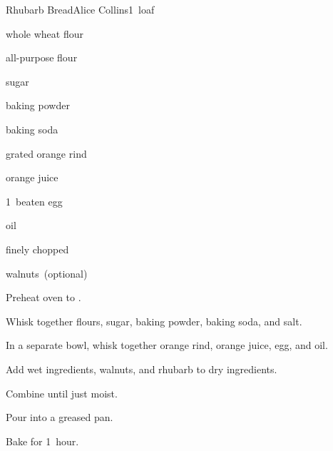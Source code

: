 \begin{recipe}{Rhubarb Bread\UNTESTED}{Alice Collins}{1~loaf}

\begin{ingredients}
\item {} whole wheat flour
\item {} all-purpose flour
\item \C{\threequarter} sugar
\item \tp{1\half} baking powder
\item \tp{1\half} baking soda
\item {} grated orange rind
\item \C{\threequarter} orange juice
\item 1~beaten egg
\item {} oil
\item \C{1\half} finely chopped 
\item \C{\half} walnuts~(optional)
\end{ingredients}

\begin{directions}
\item Preheat oven to .
\item Whisk together flours, sugar, baking powder, baking soda, and salt.
\item In a separate bowl, whisk together orange rind, orange juice, egg, and oil.
\item Add wet ingredients, walnuts, and rhubarb to dry ingredients.
\item Combine until just moist.
\item Pour into a greased pan.
\item Bake for 1~hour.
\end{directions}

\end{recipe}
